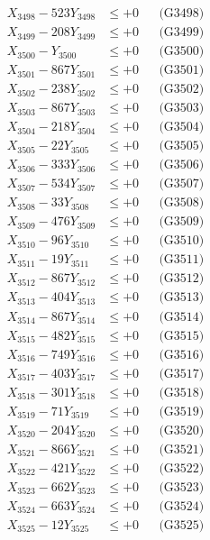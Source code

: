 \documentclass[a4paper,10pt]{article}
\begin{document}
{\begin{align}
X_{3498} - 523Y_{3498} &\leq +0 && \text{(G3498)} \\
X_{3499} - 208Y_{3499} &\leq +0 && \text{(G3499)} \\
X_{3500} - Y_{3500} &\leq +0 && \text{(G3500)} \\
\allowbreak
X_{3501} - 867Y_{3501} &\leq +0 && \text{(G3501)} \\
X_{3502} - 238Y_{3502} &\leq +0 && \text{(G3502)} \\
X_{3503} - 867Y_{3503} &\leq +0 && \text{(G3503)} \\
X_{3504} - 218Y_{3504} &\leq +0 && \text{(G3504)} \\
X_{3505} - 22Y_{3505} &\leq +0 && \text{(G3505)} \\
X_{3506} - 333Y_{3506} &\leq +0 && \text{(G3506)} \\
X_{3507} - 534Y_{3507} &\leq +0 && \text{(G3507)} \\
X_{3508} - 33Y_{3508} &\leq +0 && \text{(G3508)} \\
X_{3509} - 476Y_{3509} &\leq +0 && \text{(G3509)} \\
X_{3510} - 96Y_{3510} &\leq +0 && \text{(G3510)} \\
\allowbreak
X_{3511} - 19Y_{3511} &\leq +0 && \text{(G3511)} \\
X_{3512} - 867Y_{3512} &\leq +0 && \text{(G3512)} \\
X_{3513} - 404Y_{3513} &\leq +0 && \text{(G3513)} \\
X_{3514} - 867Y_{3514} &\leq +0 && \text{(G3514)} \\
X_{3515} - 482Y_{3515} &\leq +0 && \text{(G3515)} \\
X_{3516} - 749Y_{3516} &\leq +0 && \text{(G3516)} \\
X_{3517} - 403Y_{3517} &\leq +0 && \text{(G3517)} \\
X_{3518} - 301Y_{3518} &\leq +0 && \text{(G3518)} \\
X_{3519} - 71Y_{3519} &\leq +0 && \text{(G3519)} \\
X_{3520} - 204Y_{3520} &\leq +0 && \text{(G3520)} \\
\allowbreak
X_{3521} - 866Y_{3521} &\leq +0 && \text{(G3521)} \\
X_{3522} - 421Y_{3522} &\leq +0 && \text{(G3522)} \\
X_{3523} - 662Y_{3523} &\leq +0 && \text{(G3523)} \\
X_{3524} - 663Y_{3524} &\leq +0 && \text{(G3524)} \\
X_{3525} - 12Y_{3525} &\leq +0 && \text{(G3525)} \\

\end{align}}
\end{document}
